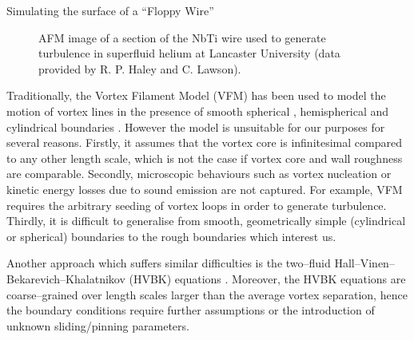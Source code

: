 \begin{chapter}{\label{cha:afm}Simulating the surface of a ``Floppy Wire''}
\begin{figure}
  \centering
  \caption{\label{fig:afmreal}AFM image of a section of the NbTi wire used to generate turbulence in superfluid helium at Lancaster University (data provided by R. P. Haley and C. Lawson).}
\end{figure}

Traditionally, the Vortex Filament Model (VFM) \cite{Schwarz}
has been used to model the motion of vortex lines in the presence of
smooth spherical \cite{Hanninen-sphere,Kivotides-sphere},
hemispherical \cite{Schwarz-bump,PhysRevB.50.579} 
and cylindrical boundaries \cite{Hanninen-PNAS,goto08}.
However the model is unsuitable for our purposes for several reasons.
Firstly, it assumes that the vortex core is infinitesimal compared to 
any other length scale, which is not the case if
vortex core and wall roughness are comparable.
Secondly, microscopic behaviours such as vortex nucleation or kinetic energy losses due
to sound emission are not captured. For example, VFM requires the arbitrary seeding of
vortex loops in order to generate turbulence.
Thirdly, it is difficult to generalise from smooth, geometrically simple (cylindrical or spherical)
boundaries to the rough boundaries which interest us.

Another approach which suffers similar difficulties \cite{Henderson} is
the two--fluid Hall--Vinen--Bekarevich--Khalatnikov (HVBK)
equations \cite{Salort2011,Salort2012}. Moreover, the HVBK equations are coarse--grained over
length scales larger than the average vortex separation, hence the
boundary conditions require further assumptions or the introduction of
unknown sliding/pinning parameters.



\end{chapter}
